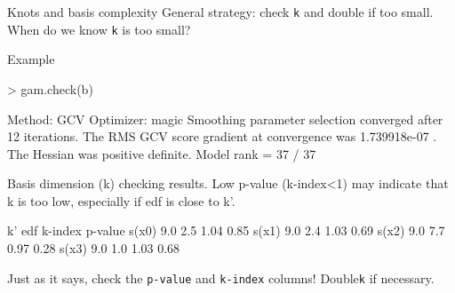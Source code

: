 

\begin{block}{Knots and basis complexity}
  General strategy: check \texttt{k} and double if too small.\\
  When do we know \texttt{k} is too small?

        \begin{exampleblock}{Example}
          \begin{Rbg}
> gam.check(b)

Method: GCV   Optimizer: magic
Smoothing parameter selection converged
after 12 iterations.
The RMS GCV score gradient at convergence
was 1.739918e-07 .
The Hessian was positive definite.
Model rank =  37 / 37 

Basis dimension (k) checking results. 
Low p-value (k-index<1) may
indicate that k is too low, especially if
edf is close to k'.

       k' edf k-index p-value
s(x0) 9.0 2.5    1.04    0.85
s(x1) 9.0 2.4    1.03    0.69
s(x2) 9.0 7.7    0.97    0.28
s(x3) 9.0 1.0    1.03    0.68

          \end{Rbg}
        \end{exampleblock}
Just as it says, check the \texttt{p-value} and \texttt{k-index} columns! Double\texttt{k} if necessary.

\end{block}






